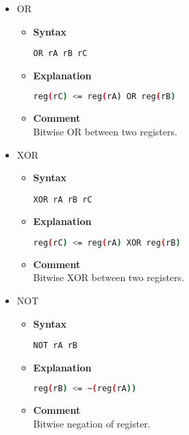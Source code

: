 \begin{itemize}
    \item OR
    \begin{itemize}
        \item \textbf{Syntax}
        \begin{lstlisting}[language={[markII]Assembler}, frame=single]
    OR rA rB rC
        \end{lstlisting}
        \item \textbf{Explanation}
        \begin{lstlisting}[language=bash, frame=single]
    reg(rC) <= reg(rA) OR reg(rB)
        \end{lstlisting}
        \item \textbf{Comment} \\
    Bitwise OR between two registers.
    \end{itemize}

    \item XOR
    \begin{itemize}
        \item \textbf{Syntax}
        \begin{lstlisting}[language={[markII]Assembler}, frame=single]
    XOR rA rB rC
        \end{lstlisting}
        \item \textbf{Explanation}
        \begin{lstlisting}[language=bash, frame=single]
    reg(rC) <= reg(rA) XOR reg(rB)
        \end{lstlisting}
        \item \textbf{Comment} \\
    Bitwise XOR between two registers.
    \end{itemize}

    \item NOT
    \begin{itemize}
        \item \textbf{Syntax}
        \begin{lstlisting}[language={[markII]Assembler}, frame=single]
    NOT rA rB
        \end{lstlisting}
        \item \textbf{Explanation}
        \begin{lstlisting}[language=bash, frame=single]
    reg(rB) <= ~(reg(rA))
        \end{lstlisting}
        \item \textbf{Comment} \\
    Bitwise negation of register.
    \end{itemize}


\end{itemize}
